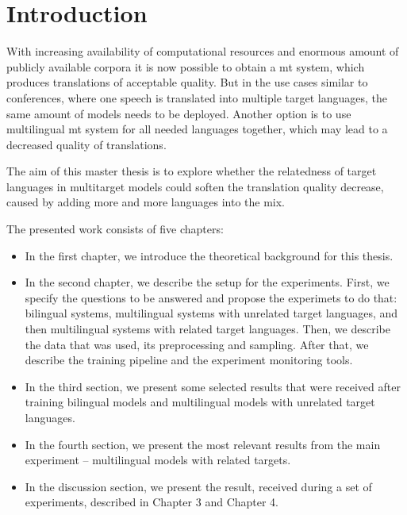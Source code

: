 \chapter*{Introduction}
With increasing availability of computational resources and enormous amount
of publicly available corpora it is now possible to obtain
a \acrfull{mt} system, which produces translations of acceptable quality.
But in the use cases similar to conferences, where one speech is translated
into multiple target languages, the same amount of models needs to be deployed.
Another option is to use multilingual \acrshort{mt} system for all needed languages together,
which may lead to a decreased quality of translations. \par

The aim of this master thesis is to explore whether the relatedness of target languages in multitarget models could soften the translation quality decrease, caused by adding more and more languages into the mix.


The presented work consists of five chapters:
\begin{itemize}
    \item In the first chapter, we introduce the theoretical background for this thesis.

 \item In the second chapter, we describe the setup for the experiments.
First, we specify the questions to be answered and propose the experimets to do that:
bilingual systems, multilingual systems with unrelated target languages, and then
multilingual systems with related target languages.
Then, we describe the data that was used, its preprocessing and sampling.
After that, we describe the training pipeline and the experiment monitoring tools.

 \item In the third section, we present some selected results that were received after training
bilingual models and multilingual models with unrelated target languages.

 \item In the fourth section, we present the most relevant results from the main experiment --
multilingual models with related targets.

 \item In the discussion section, we present the result, received during a set of experiments, described in Chapter 3 and Chapter 4.

\end{itemize}